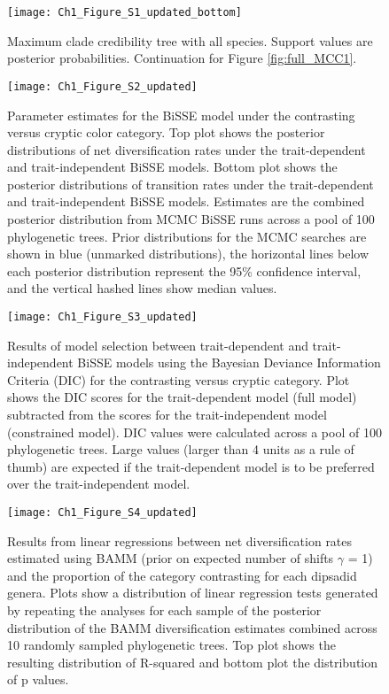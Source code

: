 \begin{figure}[h]
	\centering
	\texttt{[image: Ch1\_Figure\_S1\_updated\_bottom]}
	\caption[Maximum clade credibility tree with all species (Part 2).]{Maximum clade credibility tree with all species. Support values are posterior probabilities. Continuation for Figure \ref{fig:full_MCC1}.}
	\label{fig:full_MCC2} %
\end{figure}

\begin{figure}[h]
	\centering
	\texttt{[image: Ch1\_Figure\_S2\_updated]}
	\caption[Parameter estimates for the BiSSE model under the contrasting versus cryptic color category.]{Parameter estimates for the BiSSE model under the contrasting versus cryptic color category. Top plot shows the posterior distributions of net diversification rates under the trait-dependent and trait-independent BiSSE models. Bottom plot shows the posterior distributions of transition rates under the trait-dependent and trait-independent BiSSE models. Estimates are the combined posterior distribution from MCMC BiSSE runs across a pool of 100 phylogenetic trees. Prior distributions for the MCMC searches are shown in blue (unmarked distributions), the horizontal lines below each posterior distribution represent the 95\% confidence interval, and the vertical hashed lines show median values.}
	\label{fig:par_BiSSE} %
\end{figure}

\begin{figure}[h]
	\centering
	\texttt{[image: Ch1\_Figure\_S3\_updated]}
	\caption[Results of model selection between trait-dependent and trait-independent BiSSE models.]{Results of model selection between trait-dependent and trait-independent BiSSE models using the Bayesian Deviance Information Criteria (DIC) for the contrasting versus cryptic category. Plot shows the DIC scores for the trait-dependent model (full model) subtracted from the scores for the trait-independent model (constrained model). DIC values were calculated across a pool of 100 phylogenetic trees. Large values (larger than 4 units as a rule of thumb) are expected if the trait-dependent model is to be preferred over the trait-independent model.}
	\label{fig:model_select} %
\end{figure}

\begin{figure}[h]
	\centering
	\texttt{[image: Ch1\_Figure\_S4\_updated]}
	\caption[Results from linear regressions between net diversification rates estimated using BAMM.]{Results from linear regressions between net diversification rates estimated using BAMM (prior on expected number of shifts $\gamma$ = 1) and the proportion of the category contrasting for each dipsadid genera. Plots show a distribution of linear regression tests generated by repeating the analyses for each sample of the posterior distribution of the BAMM diversification estimates combined across 10 randomly sampled phylogenetic trees. Top plot shows the resulting distribution of R-squared and bottom plot the distribution of p values.}
	\label{fig:supp_linear_BAMM} %
\end{figure}

